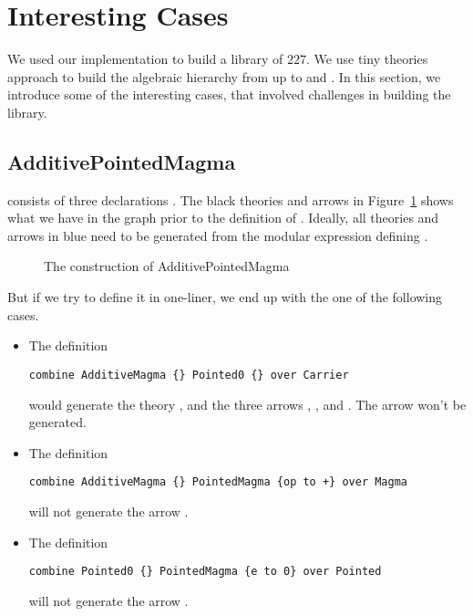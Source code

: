 \section{Interesting Cases}
\label{sec:interesting_cases}
We used our implementation to build a library of $227$. We use tiny theories approach to build the algebraic hierarchy from  up to  and  . In this section, we introduce some of the interesting cases, that involved challenges in building the library. 

\subsection{AdditivePointedMagma}
 consists of three declarations . 
The black theories and arrows in Figure~\ref{fig:addPointedMagma} shows what we  have in the graph prior to the definition of . Ideally, all theories and arrows in blue need to be generated from the modular expression defining . 
\begin{figure}[h]
    \caption{The construction of AdditivePointedMagma}
    \label{fig:addPointedMagma}
\end{figure}
But if we try to define it in one-liner, we end up with the one of the following cases. 
\begin{itemize}
 \item The definition 
\begin{lstlisting}
combine AdditiveMagma {} Pointed0 {} over Carrier
\end{lstlisting}
would generate the theory , and the three arrows 
, 
, 
and . 
The arrow  won't be generated. 

\item The definition 
\begin{lstlisting}
combine AdditiveMagma {} PointedMagma {op to +} over Magma 
\end{lstlisting}
will not generate the arrow . 

\item The definition 
\begin{lstlisting}
combine Pointed0 {} PointedMagma {e to 0} over Pointed 
\end{lstlisting}
will not generate the arrow . 
\end{itemize}
